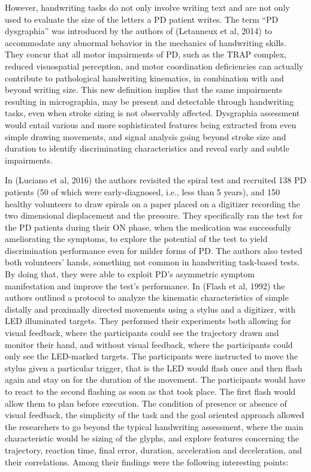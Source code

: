 However, handwriting tasks do not only involve writing text and are not only used to evaluate the size of the letters a \gls{PD} patient writes. The term ``PD dysgraphia'' was introduced by the authors of (Letanneux et al, 2014) to accommodate any abnormal behavior in the mechanics of handwriting skills. They concur that all motor impairments of PD, such as the TRAP complex, reduced visuospatial perception, and motor coordination deficiencies can actually contribute to pathological handwriting kinematics, in combination with and beyond writing size. This new definition implies that the same impairments resulting in micrographia, may be present and detectable through handwriting tasks, even when stroke sizing is not observably affected. Dysgraphia assessment would entail various and more sophisticated features being extracted from even simple drawing movements, and signal analysis going beyond stroke size and duration to identify discriminating characteristics and reveal early and subtle impairments. 

In (Luciano et al, 2016) the authors revisited the spiral test and recruited 138 \gls{PD} patients (50 of which were early-diagnosed, i.e., less than 5 years), and 150 healthy volunteers to draw spirals on a paper placed on a digitizer recording the two dimensional displacement and the pressure. They specifically ran the test for the \gls{PD} patients during their ON phase, when the medication was successfully ameliorating the symptoms, to explore the potential of the test to yield discrimination performance even for milder forms of PD. The authors also tested both volunteers' hands, something not common in handwriting task-based tests. By doing that, they were able to exploit PD's asymmetric symptom manifestation and improve the test's performance. 
In (Flash et al, 1992) the authors outlined a protocol to analyze the kinematic characteristics of simple distally and proximally directed movements using a stylus and a digitizer, with LED illuminated targets. They performed their experiments both allowing for visual feedback, where the participants could see the trajectory drawn and monitor their hand, and without visual feedback, where the participants could only see the LED-marked targets. The participants were instructed to move the stylus given a particular trigger, that is the LED would flash once and then flash again and stay on for the duration of the movement. The participants would have to react to the second flashing as soon as that took place. The first flash would allow them to plan before execution. The condition of presence or absence of visual feedback, the simplicity of the task and the goal oriented approach allowed the researchers to go beyond the typical handwriting assessment, where the main characteristic would be sizing of the glyphs, and explore features concerning the trajectory, reaction time, final error, duration, acceleration and deceleration, and their correlations. Among their findings were the following interesting points:

